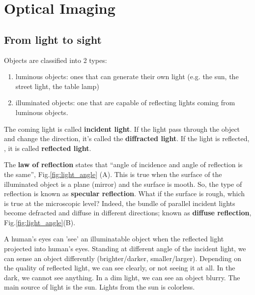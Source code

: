 \chapter{Optical Imaging}
\label{apdx:optical_imaging} 

\section{From light to sight}

Objects are classified into 2 types: 
\begin{enumerate}
  \item luminous objects: ones that can generate their own light (e.g. the sun,
  the street light, the table lamp)
  \item illuminated objects: one that are capable of reflecting lights coming
  from luminous objects.
\end{enumerate}
The coming light is called {\bf incident light}. If the light pass through the
object and change  the direction, it's called the {\bf diffracted light}. If the
light is reflected, , it is called {\bf reflected light}.

The {\bf law of reflection} states that ``angle of incidence and angle of
reflection is the same'', Fig.\ref{fig:light_angle} (A).
This is true when the surface of the illuminated object is a plane (mirror) and
the surface is mooth. So, the type of reflection is known as {\bf specular
reflection}. What if the surface is rough, which is true at the microscopic
level? Indeed, the bundle of parallel incident lights become defracted and
diffuse in different directions; known as {\bf diffuse reflection},
Fig.\ref{fig:light_angle}(B). 

A human's eyes can 'see' an illuminatable object when the reflected light
projected into human's eyes. Standing at different angle of the incident light,
we can sense an object differently (brighter/darker, smaller/larger). Depending
on the quality of reflected light, we can see clearly, or not seeing it at all.
In the dark, we cannot see anything. In a dim light, we can see an object
blurry. The main source of light is the sun.
Lights from the sun is colorless.

